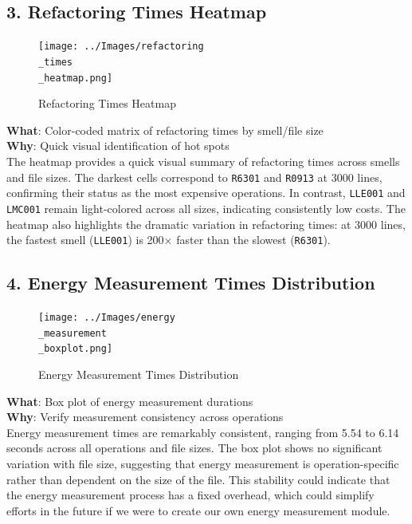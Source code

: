 \documentclass[12pt, titlepage]{article}
\begin{document}
\subsection*{3. Refactoring Times Heatmap}
\begin{figure}[H]
    \centering
    \texttt{[image: ../Images/refactoring\\\_times\\\_heatmap.png]}
    \caption{Refactoring Times Heatmap}
\end{figure}

\noindent \textbf{What}: Color-coded matrix of refactoring times by smell/file size\\

\noindent \textbf{Why}: Quick visual identification of hot spots\\

The heatmap provides a quick visual summary of refactoring times across smells and file sizes. The darkest cells correspond to \texttt{R6301} and \texttt{R0913} at 3000 lines, confirming their status as the most expensive operations. In contrast, \texttt{LLE001} and \texttt{LMC001} remain light-colored across all sizes, indicating consistently low costs. The heatmap also highlights the dramatic variation in refactoring times: at 3000 lines, the fastest smell (\texttt{LLE001}) is 200× faster than the slowest (\texttt{R6301}).

\subsection*{4. Energy Measurement Times Distribution}
\begin{figure}[H]
    \centering
    \texttt{[image: ../Images/energy\\\_measurement\\\_boxplot.png]}
    \caption{Energy Measurement Times Distribution}
\end{figure}

\noindent \textbf{What}: Box plot of energy measurement durations\\

\noindent \textbf{Why}: Verify measurement consistency across operations\\

Energy measurement times are remarkably consistent, ranging from 5.54 to 6.14 seconds across all operations and file sizes. 
The box plot shows no significant variation with file size, suggesting that energy measurement is operation-specific 
rather than dependent on the size of the file. This stability could indicate that the energy measurement process has a fixed 
overhead, which could simplify efforts in the future if we were to create our own energy measurement module. 
\end{document}
